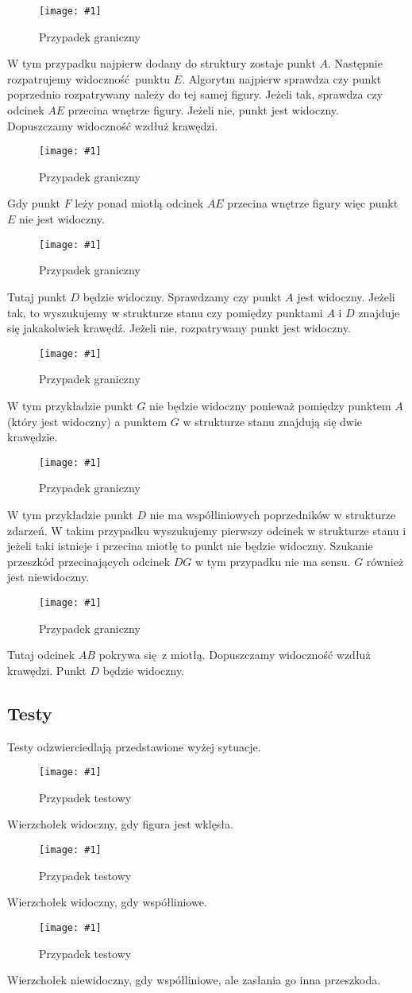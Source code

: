 \documentclass[12pt]{article}
\newcommand{\imgcustomsize}[3]{
	\begin{figure}[H]
		\centering
		\texttt{[image: \#1]}
		\caption{#2}
		\label{#1}
	\end{figure}
}
\newcommand{\img}[2]{\imgcustomsize{#1}{#2}{0.5}}
\begin{document}
			\img{przyp1.jpg}{Przypadek graniczny}
				W tym przypadku najpierw dodany do struktury zostaje punkt $ A $. Następnie rozpatrujemy widoczność punktu $ E $. Algorytm najpierw sprawdza czy punkt poprzednio rozpatrywany należy do tej samej figury. Jeżeli tak, sprawdza czy odcinek $ AE $ przecina wnętrze figury. Jeżeli nie, punkt jest widoczny. Dopuszczamy widoczność wzdłuż krawędzi.
				
			\img{przyp2.jpg}{Przypadek graniczny}
				Gdy punkt $ F $ leży ponad miotłą odcinek $ AE $ przecina wnętrze figury więc punkt $ E $ nie jest widoczny.
			
			\img{przyp3.jpg}{Przypadek graniczny}
				Tutaj punkt $ D $ będzie widoczny. Sprawdzamy czy punkt $ A $ jest widoczny. Jeżeli tak, to wyszukujemy w strukturze stanu czy pomiędzy punktami $ A $ i $ D $ znajduje się jakakolwiek krawędź. Jeżeli nie, rozpatrywany punkt jest widoczny.
				
			\img{przyp4.jpg}{Przypadek graniczny}
				W tym przykładzie punkt $ G $ nie będzie widoczny ponieważ pomiędzy punktem $ A $ (który jest widoczny) a punktem $ G $ w strukturze stanu znajdują się dwie krawędzie.
				
			\img{przyp5.jpg}{Przypadek graniczny}
				W tym przykładzie punkt $ D $ nie ma współliniowych poprzedników w strukturze zdarzeń. W takim przypadku wyszukujemy pierwszy odcinek w strukturze stanu i jeżeli taki istnieje i przecina miotłę to punkt nie będzie widoczny. Szukanie przeszkód przecinających odcinek $ DG $ w tym przypadku nie ma sensu. $ G $ również jest niewidoczny.
			
			\img{przyp6.jpg}{Przypadek graniczny}
				Tutaj odcinek $ AB $ pokrywa się z miotłą. Dopuszczamy widoczność wzdłuż krawędzi. Punkt $ D $ będzie widoczny.
						
		\subsection{Testy}
				Testy odzwierciedlają przedstawione wyżej sytuacje.
			
			\img{test1.png}{Przypadek testowy}
				Wierzchołek widoczny, gdy figura jest wklęsła.
			
			
			\img{test3.png}{Przypadek testowy}
				Wierzchołek widoczny, gdy współliniowe.
			
			\img{test4.png}{Przypadek testowy}
				Wierzchołek niewidoczny, gdy współliniowe, ale zasłania go inna przeszkoda.
			
\end{document}
